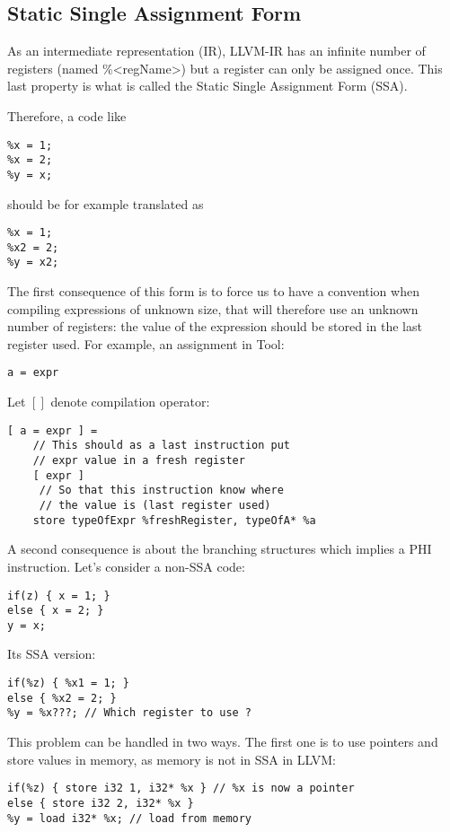 \subsection{Static Single Assignment Form}
As an intermediate representation (IR), LLVM-IR has an infinite number of registers (named \%\textless regName\textgreater ) but a register can only be assigned once. This last property is what is called the Static Single Assignment Form (SSA).

Therefore, a code like
\begin{lstlisting}
%x = 1;
%x = 2;
%y = x;
\end{lstlisting}

should be for example translated as
\begin{lstlisting}
%x = 1;
%x2 = 2;
%y = x2;
\end{lstlisting}

The first consequence of this form is to force us to have a convention when compiling expressions of unknown size, that will therefore use an unknown number of registers: the value of the expression should be stored in the last register used. For example, an assignment in Tool:
\begin{lstlisting}
a = expr
\end{lstlisting}

Let $[ ]$ denote compilation operator:
\begin{lstlisting}
[ a = expr ] = 
    // This should as a last instruction put
    // expr value in a fresh register
    [ expr ]
     // So that this instruction know where
     // the value is (last register used)
    store typeOfExpr %freshRegister, typeOfA* %a
\end{lstlisting}

A second consequence is about the branching structures which implies a PHI instruction. Let's consider a non-SSA code:
\begin{lstlisting}
if(z) { x = 1; } 
else { x = 2; }
y = x;
\end{lstlisting}

Its SSA version:
\begin{lstlisting}
if(%z) { %x1 = 1; } 
else { %x2 = 2; }
%y = %x???; // Which register to use ?
\end{lstlisting}

This problem can be handled in two ways. The first one is to use pointers and store values in memory, as memory is not in SSA in LLVM:
\begin{lstlisting}
if(%z) { store i32 1, i32* %x } // %x is now a pointer
else { store i32 2, i32* %x }
%y = load i32* %x; // load from memory
\end{lstlisting}

